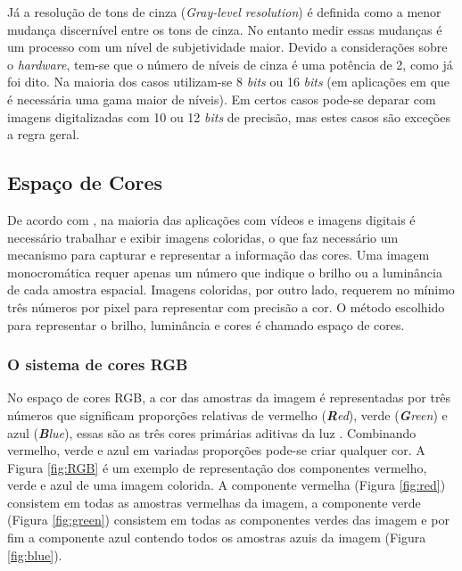  Já a resolução de tons de cinza (\textit{Gray-level resolution}) é definida como a menor mudança discernível entre os tons de cinza. No entanto medir essas mudanças é um processo com um nível de subjetividade maior. Devido a considerações sobre o \textit{hardware}, tem-se que o número de níveis de cinza é uma potência de 2, como já foi dito. Na maioria dos casos utilizam-se 8 \textit{bits} ou 16 \textit{bits} (em aplicações em que é necessária uma gama maior de níveis). Em certos casos pode-se deparar com imagens digitalizadas com 10 ou 12 \textit{bits} de precisão, mas estes casos são exceções a regra geral.


\subsection{Espaço de Cores}

De acordo com \cite{richardson2011h}, na maioria das aplicações com vídeos e imagens digitais é necessário trabalhar e exibir imagens coloridas, o que faz necessário um mecanismo para capturar e representar a informação das cores. Uma imagem monocromática requer apenas um número que indique o brilho ou a luminância de cada amostra espacial. Imagens coloridas, por outro lado, requerem no mínimo três números por pixel para representar com precisão a cor. O método escolhido para representar o brilho, luminância e cores é chamado espaço de cores.

\subsubsection{O sistema de cores RGB}

No espaço de cores RGB, a cor das amostras da imagem é representadas por três números que significam proporções relativas de vermelho (\textit{\textbf{R}ed}), verde (\textit{\textbf{G}reen}) e azul (\textit{\textbf{B}lue}), essas são as três cores primárias aditivas da luz \cite{richardson2011h}.	Combinando vermelho, verde e azul em variadas proporções pode-se criar qualquer cor. A Figura \ref{fig:RGB} é um exemplo de representação dos componentes vermelho, verde e azul de uma imagem colorida. A componente vermelha (Figura \ref{fig:red}) consistem em todas as amostras vermelhas da imagem, a componente verde (Figura \ref{fig:green}) consistem em todas as componentes verdes das imagem e por fim a componente azul contendo todos os amostras azuis da imagem (Figura \ref{fig:blue}).

